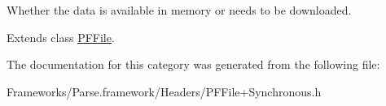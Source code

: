  





Whether the data is available in memory or needs to be downloaded. 

Extends class \hyperlink{interface_p_f_file_a5738638cfa60a28a222a0b4e8f97bd3e}{P\+F\+File}.



The documentation for this category was generated from the following file\+:\begin{DoxyCompactItemize}
\item 
Frameworks/\+Parse.\+framework/\+Headers/P\+F\+File+\+Synchronous.\+h\end{DoxyCompactItemize}

